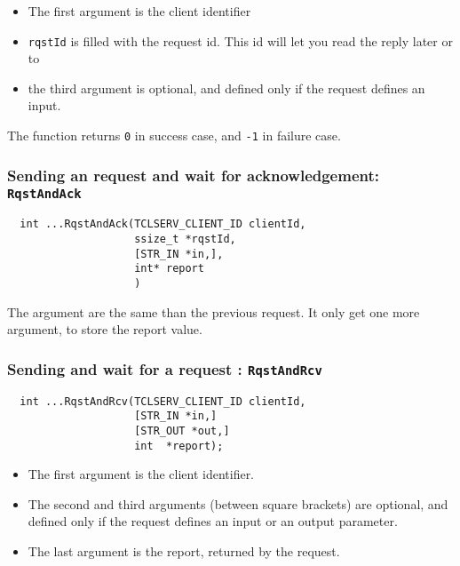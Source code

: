 \begin{itemize}
\item The first argument is the client identifier

\item \texttt{rqstId} is filled with the request id. This id will let you
read the reply later or to 

\item the third argument is optional, and defined only if the request defines
an input.
\end{itemize}

The function returns \texttt{0} in success case, and \texttt{-1} in failure case.

\subsubsection{Sending an request and wait for acknowledgement: \texttt{RqstAndAck}}

\begin{center}\begin{cartouche}\small\begin{verbatim}
  int ...RqstAndAck(TCLSERV_CLIENT_ID clientId,
                    ssize_t *rqstId, 
                    [STR_IN *in,],
                    int* report
					)
\end{verbatim}\end{cartouche}\end{center}

The argument are the same than the previous request. It only get one more
argument, to store the report value.

\subsubsection{Sending and wait for a request :  \texttt{RqstAndRcv}}

\begin{center}\begin{cartouche}\small\begin{verbatim}
  int ...RqstAndRcv(TCLSERV_CLIENT_ID clientId,
                    [STR_IN *in,] 
                    [STR_OUT *out,] 
                    int  *report);
\end{verbatim}\end{cartouche}\end{center}
\begin{itemize}
\item The first argument is the client identifier.

\item The second and third arguments (between square brackets) are
optional, and defined only if the request defines an input or an output
parameter.

\item The last argument is the report, returned by the request. 
\end{itemize}

